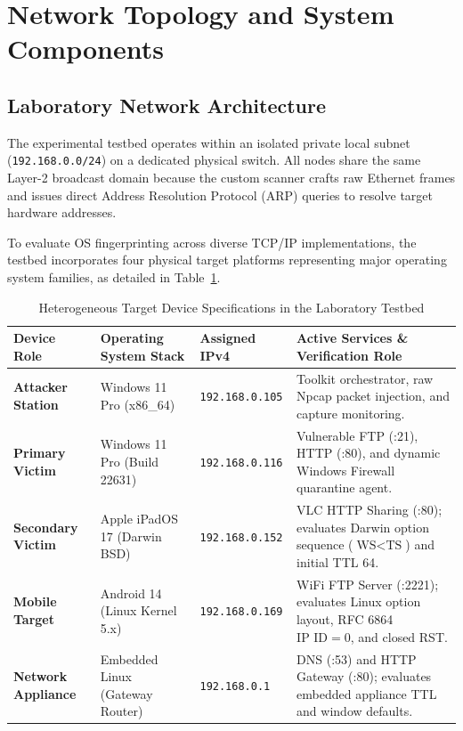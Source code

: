 \documentclass[11pt,a4paper]{article}
\begin{document}
\clearpage

\section{Network Topology and System Components}

\subsection{Laboratory Network Architecture}
The experimental testbed operates within an isolated private local subnet (\texttt{192.168.0.0/24}) on a dedicated physical switch. All nodes share the same Layer-2 broadcast domain because the custom scanner crafts raw Ethernet frames and issues direct Address Resolution Protocol (ARP) queries to resolve target hardware addresses.

To evaluate OS fingerprinting across diverse TCP/IP implementations, the testbed incorporates four physical target platforms representing major operating system families, as detailed in Table~\ref{tab:testbed_devices}.

\begin{table}[H]
\centering
\small
\renewcommand{\arraystretch}{1.18}
\caption{Heterogeneous Target Device Specifications in the Laboratory Testbed}
\label{tab:testbed_devices}
\begin{tabularx}{\textwidth}{>{\raggedright\arraybackslash\bfseries}p{2.6cm} >{\raggedright\arraybackslash}p{3.1cm} >{\centering\arraybackslash}p{2.9cm} >{\raggedright\arraybackslash}X}
\toprule
\textbf{Device Role} & \textbf{Operating System Stack} & \textbf{Assigned IPv4} & \textbf{Active Services \& Verification Role} \\
\midrule
Attacker Station & Windows 11 Pro (x86\_64) & \texttt{192.168.0.105} & Toolkit orchestrator, raw Npcap packet injection, and capture monitoring. \\
\rowcolor{lightbg}
Primary Victim & Windows 11 Pro (Build 22631) & \texttt{192.168.0.116} & Vulnerable FTP (:21), HTTP (:80), and dynamic Windows Firewall quarantine agent. \\
Secondary Victim & Apple iPadOS 17 (Darwin BSD) & \texttt{192.168.0.152} & VLC HTTP Sharing (:80); evaluates Darwin option sequence ($\text{WS} < \text{TS}$) and initial TTL 64. \\
\rowcolor{lightbg}
Mobile Target & Android 14 (Linux Kernel 5.x) & \texttt{192.168.0.169} & WiFi FTP Server (:2221); evaluates Linux option layout, RFC 6864 $\text{IP ID} = 0$, and closed RST. \\
Network Appliance & Embedded Linux (Gateway Router) & \texttt{192.168.0.1} & DNS (:53) and HTTP Gateway (:80); evaluates embedded appliance TTL and window defaults. \\
\bottomrule
\end{tabularx}
\end{table}
\end{document}
